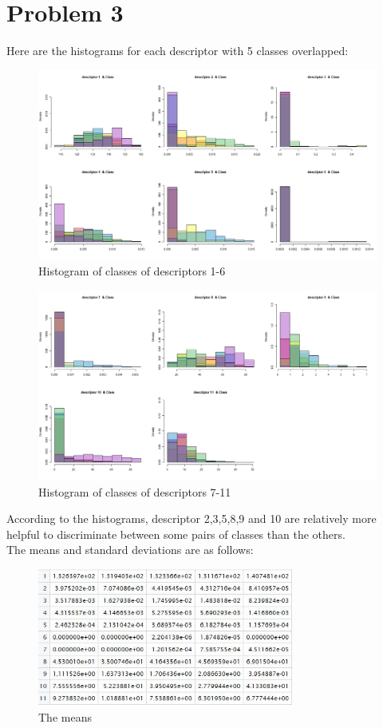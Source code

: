 \documentclass{article}
\begin{document}
\section{Problem 3}
Here are the histograms for each descriptor with 5 classes overlapped:
  \begin{figure}[H]
  \centering
  \includegraphics[width=1.35\textwidth]{DesCla1-6.jpg}
  \caption{Histogram of classes of descriptors 1-6}\label{}
  \end{figure}
  \begin{figure}[H]
  \centering
  \includegraphics[width=1.35\textwidth]{DesCla7-11.jpg}
  \caption{Histogram of classes of descriptors 7-11}\label{}
  \end{figure}
According to the histograms, descriptor 2,3,5,8,9 and 10 are relatively more helpful to discriminate between some pairs of classes than the others.\\
The means and standard deviations are as follows:
  \begin{figure}[H]
  \centering
  \includegraphics[width=0.75\textwidth]{mc.jpg}
  \caption{The means}\label{}
  \end{figure}
\end{document}
